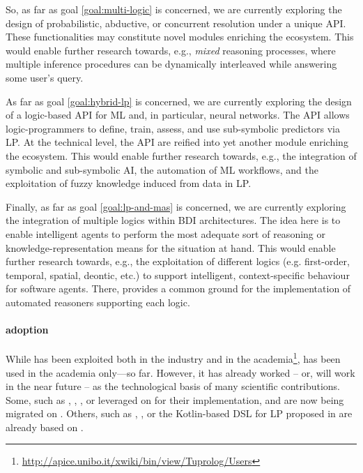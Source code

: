 \documentclass[12pt,a4paper,openright,twoside]{book}
\begin{document}

So, as far as goal \ref{goal:multi-logic} is concerned, we are currently exploring the design of probabilistic, abductive, or concurrent resolution under a unique API.
%
These functionalities may constitute novel modules enriching the \twopkt{} ecosystem.
%
This would enable further research towards, e.g., \emph{mixed} reasoning processes, where multiple inference procedures can be dynamically interleaved while answering some user's query.

As far as goal \ref{goal:hybrid-lp} is concerned, we are currently exploring the design of a logic-based API for ML and, in particular, neural networks.
%
The API allows logic-programmers to define, train, assess, and use sub-symbolic predictors via LP.
%
At the technical level, the API are reified into yet another module enriching the \twopkt{} ecosystem.
%
This would enable further research towards, e.g., the integration of symbolic and sub-symbolic AI, the automation of ML workflows, and the exploitation of fuzzy knowledge induced from data in LP.

Finally, as far as goal \ref{goal:lp-and-mas} is concerned, we are currently exploring the integration of multiple logics within BDI architectures.
%
The idea here is to enable intelligent agents to perform the most adequate sort of reasoning or knowledge-representation means for the situation at hand.
%
This would enable further research towards, e.g., the exploitation of different logics (e.g. first-order, temporal, spatial, deontic, etc.) to support intelligent, context-specific behaviour for software agents.
%
There, \twopkt{} provides a common ground for the implementation of automated reasoners supporting each logic.

\paragraph{\twopkt{} adoption}

While \tuprolog{} has been exploited both in the industry and in the academia\footnote{\url{http://apice.unibo.it/xwiki/bin/view/Tuprolog/Users}}, \twopkt{} has been used in the academia only---so far.
%
However, it has already worked -- or, will work in the near future -- as the technological basis of many scientific contributions.
%
Some, such as \tucson{} \cite{tucson-jaamas2}, \respect{} \cite{respect-scp41}, \lpaas{} \cite{lpaas-bdcc2}, or \tenderfone{} \cite{blockchainmas-applsci10} leveraged on \tuprolog{} for their implementation, and are now being migrated on \twopkt{}.
%
Others, such as \tusow{} \cite{tusow-icccn2019}, \argtwop{} \cite{arg2p-cilc2020}, or the Kotlin-based DSL for LP proposed in \cite{kotlindsi4prolog-woa2020} are already based on \twopkt{}.
\end{document}
